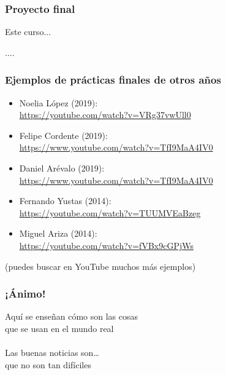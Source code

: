 
\begin{frame}
 \frametitle{Proyecto final}

Este curso...

\vspace{1cm}

\begin{center}
  \Huge ....
\end{center}
\end{frame}



\begin{frame}
\frametitle{Ejemplos de prácticas finales de otros años}

\begin{itemize}
\item Noelia López (2019): \\ \url{https://youtube.com/watch?v=VRg37vwUll0}
\item Felipe Cordente (2019): \\ \url{https://www.youtube.com/watch?v=TfI9MaA4IV0}
\item Daniel Arévalo (2019): \\ \url{https://www.youtube.com/watch?v=TfI9MaA4IV0}
\item Fernando Yustas (2014):\\ \url{https://youtube.com/watch?v=TUUMVEaBzeg}
\item Miguel Ariza (2014): \\ \url{https://youtube.com/watch?v=fVBx9cGPjWs}
\end{itemize}

(puedes buscar en YouTube muchos más ejemplos)

\end{frame}




\begin{frame}
\frametitle{¡Ánimo!}

\begin{center}
{\huge Aquí se enseñan cómo son las cosas \\
  que se usan en el mundo real \\
  ~ \\
  Las buenas noticias son\dots \\
  que no son tan difíciles\\}
\end{center}

\end{frame}



